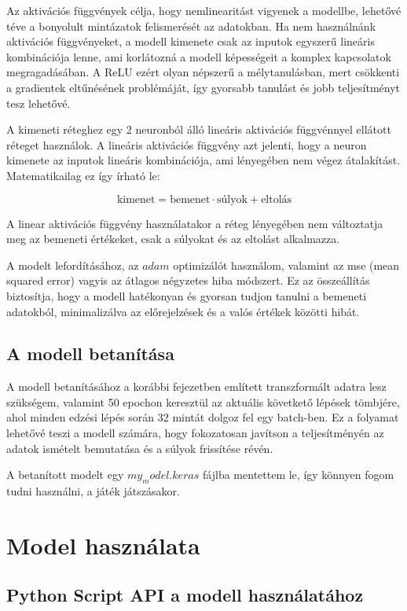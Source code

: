 Az aktivációs függvények célja, hogy nemlinearitást vigyenek a modellbe, lehetővé téve a bonyolult mintázatok felismerését az adatokban. 
Ha nem használnánk aktivációs függvényeket, a modell kimenete csak az inputok egyszerű lineáris kombinációja lenne, ami korlátozná a modell képességeit a komplex kapcsolatok megragadásában.
A ReLU ezért olyan népszerű a mélytanulásban, mert csökkenti a gradientek eltűnésének problémáját, így gyorsabb tanulást és jobb teljesítményt tesz lehetővé.

A kimeneti réteghez egy 2 neuronból álló lineáris aktivációs függvénnyel ellátott réteget használok. A lineáris aktivációs függvény azt jelenti, hogy a neuron kimenete az inputok lineáris kombinációja, ami lényegében nem végez átalakítást. Matematikailag ez így írható le:

\[ \text{kimenet} = \text{bemenet} \cdot \text{súlyok} + \text{eltolás} \]

A linear aktivációs függvény használatakor a réteg lényegében nem változtatja meg az bemeneti értékeket, csak a súlyokat és az eltolást alkalmazza.

A modelt lefordításához, az $adam$ optimizálót használom, valamint az mse (mean squared error) vagyis az átlagos négyzetes hiba módszert. 
Ez az összeállítás biztosítja, hogy a modell hatékonyan és gyorsan tudjon tanulni a bemeneti adatokból, minimalizálva az előrejelzések és a valós értékek közötti hibát.

\subsection{A modell betanítása}
A modell betanításához a korábbi fejezetben említett transzformált adatra lesz szükségem,
valamint 50 epochon keresztül az aktuális követkető lépések tömbjére, ahol minden edzési lépés során 32 mintát dolgoz fel egy batch-ben. 
Ez a folyamat lehetővé teszi a modell számára, hogy fokozatosan javítson a teljesítményén az adatok ismételt bemutatása és a súlyok frissítése révén. 

A betanított modelt egy $my_model.keras$ fájlba mentettem le, így könnyen fogom tudni használni, a játék játszásakor. 

\section{Model használata}

\subsection{Python Script API a modell használatához}


